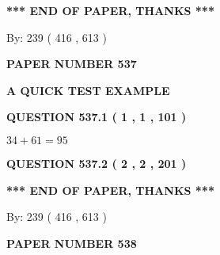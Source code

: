 \documentclass[12pt]{article}
\begin{document}
   
   
\vspace{1.0in} 
{\textbf{\large{ *** END OF PAPER, THANKS *** }}} 
   
   
\hspace{1.0in} By: 
 239 ( 416 ,  613 )
   
   
   
   
\newpage 
\setcounter{page}{ 
   537001 } 
   
   
   
   
 {\textbf{ \Large{ PAPER NUMBER  537  }}}
   
   
\vspace{0.2in}
   
   
   
   
   
   
 \vspace{0.2in}
{\LARGE {\textbf{ A QUICK TEST EXAMPLE}}}
   
   
  
\vspace{0.2in}
  
{\textbf{\Large{QUESTION
537.1 
 ( 1 , 1 , 101 )
}}}
  
  
 
 

$ %
34 +  %
61=   %
95$
 
 
  
\vspace{0.2in}
  
{\textbf{\Large{QUESTION
537.2 
 ( 2 , 2 , 201 )
}}}
  
  
   
   
 \vspace{0.2in}
 
   
   
   
   
\vspace{1.0in} 
{\textbf{\large{ *** END OF PAPER, THANKS *** }}} 
   
   
\hspace{1.0in} By: 
 239 ( 416 ,  613 )
   
   
   
   
\newpage 
\setcounter{page}{ 
   538001 } 
   
   
   
   
 {\textbf{ \Large{ PAPER NUMBER  538  }}}
   
   
\vspace{0.2in}
   
\end{document}

